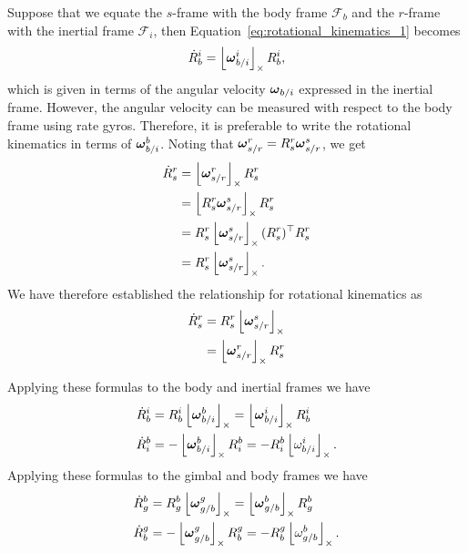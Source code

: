 Suppose that we equate the $s$-frame with the body frame $\mathcal{F}_b$ and the $r$-frame with the inertial frame $\mathcal{F}_i$, then Equation~\eqref{eq:rotational_kinematics_1} becomes
\[
\dot{R}_b^i = \left\lfloor\boldsymbol{\omega}_{b/i}^i\right\rfloor_{\times} R_b^i,
\]
which is given in terms of the angular velocity $\boldsymbol{\omega}_{b/i}$ expressed in the inertial frame.  However, the angular velocity can be measured with respect to the body frame using rate gyros.  Therefore, it is preferable to write the rotational kinematics in terms of $\boldsymbol{\omega}_{b/i}^b$.  Noting that $\boldsymbol{\omega}_{s/r}^r = R_s^r \boldsymbol{\omega}_{s/r}^s$, we get
\begin{align*}
\dot{R}_s^r &= \left\lfloor\boldsymbol{\omega}_{s/r}^r\right\rfloor_{\times} R_s^r	\\
			&= \left\lfloor R_s^r\boldsymbol{\omega}_{s/r}^s\right\rfloor_{\times} R_s^r \\
			&= R_s^r \left\lfloor\boldsymbol{\omega}_{s/r}^s\right\rfloor_{\times} (R_s^r)^\top R_s^r \\
			&= R_s^r \left\lfloor\boldsymbol{\omega}_{s/r}^s\right\rfloor_{\times}.
\end{align*}
We have therefore established the relationship for rotational kinematics as
\begin{align}
	\dot{R}_s^r &= R_s^r \ss{\omegabf_{s/r}^s} \label{eq:rotational_kinematics} \\
				&= \ss{\omegabf_{s/r}^r} R_s^r \label{eq:rotational_kinematics_alt}
\end{align}

Applying these formulas to the body and inertial frames we have
\begin{align}
\dot{R}_b^i &= R_b^i \ss{\omegabf_{b/i}^b} = \ss{\omegabf_{b/i}^i} R_b^i \label{eq:rotational_kinematics_b_i} \\
\dot{R}_i^b &= -\ss{\omegabf_{b/i}^b} R_i^b = - R_i^b \ss{\omega_{b/i}^i}.\label{eq:rotational_kinematics_i_b}
\end{align}
Applying these formulas to the gimbal and body frames we have
\begin{align*}
\dot{R}_g^b &= R_g^b \left\lfloor\boldsymbol{\omega}_{g/b}^g\right\rfloor_{\times} = \left\lfloor\boldsymbol{\omega}_{g/b}^b\right\rfloor_{\times} R_g^b \\
\dot{R}_b^g &= -\left\lfloor\boldsymbol{\omega}_{g/b}^g\right\rfloor_{\times} R_b^g = - R_b^g \left\lfloor\omega_{g/b}^b\right\rfloor_{\times}.
\end{align*}

